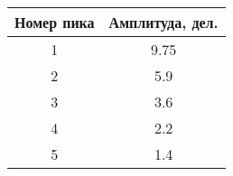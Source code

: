 \begin{tabular}{|c|c|}
\hline
Номер пика & Амплитуда, дел. \\ \hline
1 & 9.75 \\ \hline
2 & 5.9 \\ \hline
3 & 3.6 \\ \hline
4 & 2.2 \\ \hline
5 & 1.4 \\ \hline
\end{tabular}
